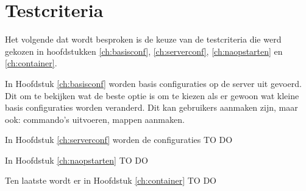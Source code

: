 \newpage

\section{Testcriteria}
Het volgende dat wordt besproken is de keuze van de testcriteria die werd gekozen in hoofdstukken \ref*{ch:basisconf}, \ref*{ch:serverconf}, \ref*{ch:naopstarten} en \ref*{ch:container}. 

In Hoofdstuk \ref*{ch:basisconf} worden basis configuraties op de server uit gevoerd. Dit om te bekijken wat de beste optie is om te kiezen als er gewoon wat kleine basis configuraties worden veranderd. Dit kan gebruikers aanmaken zijn, maar ook: commando's uitvoeren, mappen aanmaken. 

In Hoofdstuk \ref*{ch:serverconf} worden de configuraties TO DO

In Hoofdstuk \ref*{ch:naopstarten} TO DO

Ten laatste wordt er in Hoofdstuk \ref*{ch:container} TO DO



